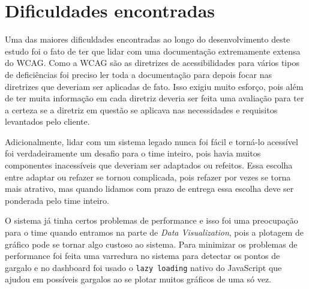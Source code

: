 \section{Dificuldades encontradas}
\label{sec:dificuldades}
{
Uma das maiores dificuldades encontradas ao longo do desenvolvimento deste estudo foi o fato de ter que lidar com uma documentação extremamente extensa do WCAG. Como a WCAG são as diretrizes de acessibilidades para vários tipos de deficiências foi preciso ler toda a documentação para depois focar nas diretrizes que deveriam ser aplicadas de fato. Isso exigiu muito esforço, pois além de ter muita informação em cada diretriz deveria ser feita uma avaliação para ter a certeza se a diretriz em questão se aplicava nas necessidades e requisitos levantados pelo cliente.

Adicionalmente, lidar com um sistema legado nunca foi fácil e torná-lo acessível foi verdadeiramente um desafio para o time inteiro, pois havia muitos componentes inacessíveis que deveriam ser adaptados ou refeitos. Essa escolha entre adaptar ou refazer se tornou complicada, pois refazer por vezes se torna mais atrativo, mas quando lidamos com prazo de entrega essa escolha deve ser ponderada pelo time inteiro.

O sistema já tinha certos problemas de performance e isso foi uma preocupação para o time quando entramos na parte de \textit{Data Visualization}, pois a plotagem de gráfico pode se tornar algo custoso ao sistema. Para minimizar os problemas de performance foi feita uma varredura no sistema para detectar os pontos de gargalo e no dashboard foi usado o \lstinline{lazy loading} nativo do JavaScript que ajudou em possíveis gargalos ao se plotar muitos gráficos de uma só vez. 
}



